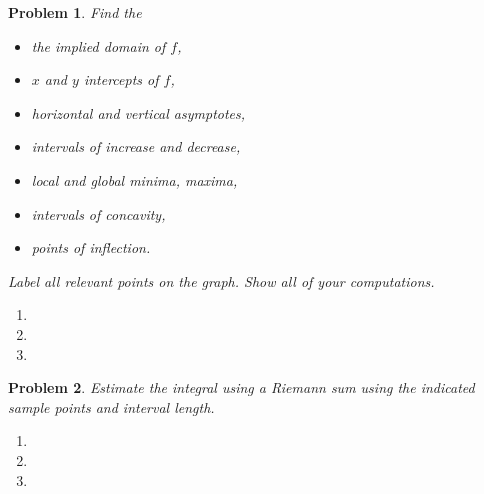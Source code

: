 \documentclass{article}
\renewcommand{\fcProblemRef}{\theproblem.\theenumi}
\newtheorem{problem}{Problem}
\begin{document}
\begin{problem}
Find the
\begin{multicols}{2}
\begin{itemize}
\item the implied domain of $f$,
\item $x$ and $y$ intercepts of $f$,
\item horizontal and vertical asymptotes,
\item intervals of increase and decrease,
\item local and global minima, maxima,
\item intervals of concavity,
\item points of inflection.
\end{itemize}
\end{multicols}
Label all relevant points on the graph. Show all of your computations.
\begin{enumerate}[ref={\fcProblemRef}]
\item 
\item 
\item 
\end{enumerate}
\end{problem}



\begin{problem}
Estimate the integral using a Riemann sum using the indicated sample points and interval length.
\begin{enumerate}[ref={\fcProblemRef}]
\item 
\item 
\item 
\end{enumerate}
\end{problem}


\end{document}
